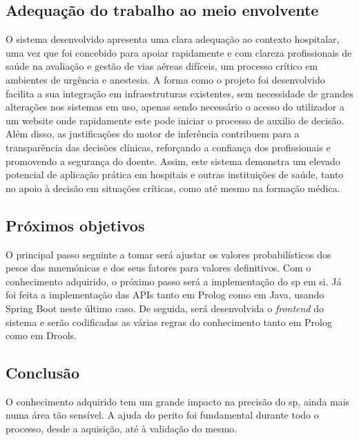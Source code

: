 \documentclass[a4paper,12pt,twoside]{article}
\begin{document}
    \subsection{Adequação do trabalho ao meio envolvente}
    O sistema desenvolvido apresenta uma clara adequação ao contexto hospitalar, uma vez que foi concebido para apoiar rapidamente e com clareza profissionais de saúde na avaliação e gestão de vias aéreas difíceis, um processo crítico em ambientes de urgência e anestesia. A forma como o projeto foi desenvolvido facilita a sua integração em infraestruturas existentes, sem necessidade de grandes alterações nos sistemas em uso, apenas sendo necessário o acesso do utilizador a um website onde rapidamente este pode iniciar o processo de auxilio de decisão. Além disso, as justificações do motor de inferência contribuem para a transparência das decisões clínicas, reforçando a confiança dos profissionais e promovendo a segurança do doente. Assim, este sistema demonstra um elevado potencial de aplicação prática em hospitais e outras instituições de saúde, tanto no apoio à decisão em situações críticas, como até mesmo na formação médica.
    \subsection{Próximos objetivos}
    O principal passo seguinte a tomar será ajustar os valores probabilísticos dos pesos das mnemónicas e dos seus fatores para valores definitivos.
    Com o conhecimento adquirido, o próximo passo será a implementação do \gls{sp} em si. Já foi feita a implementação das \glspl{API} tanto em Prolog como em Java, usando Spring Boot neste último caso. De seguida, será desenvolvida o \textit{frontend} do sistema e serão codificadas as várias regras do conhecimento tanto em Prolog como em Drools.
    \subsection{Conclusão}
    O conhecimento adquirido tem um grande impacto na precisão do \gls{sp}, ainda mais numa área tão sensível. A ajuda do perito foi fundamental durante todo o processo, desde a aquisição, até à validação do mesmo.

    \newpage

    \printglossary

    \newpage

    \nocite{*}
    \printbibliography
\end{document}
